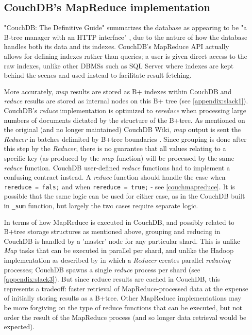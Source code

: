 

\subsection{CouchDB's MapReduce implementation}
"CouchDB: The Definitive Guide" summarizes the database as appearing to be "a B-tree manager with an HTTP interface" \cite{couchguide}, due to the nature of how the database handles both its data and its indexes. CouchDB's MapReduce API actually allows for defining indexes rather than queries; a user is given direct access to the raw indexes, unlike other DBMSs such as SQL Server where indexes are kept behind the scenes and used instead to facilitate result fetching.

More accurately, \textit{map} results are stored as B+ indexes within CouchDB and \textit{reduce} results are stored as internal nodes on this B+ tree (see \ref{appendix:slack1}). CouchDB's \textit{reduce} implementation is optimized to \textit{rereduce} when processing large numbers of documents dictated by the structure of the B+tree. As mentioned on the original (and no longer maintained) CouchDB Wiki, \textit{map} output is sent the \textit{Reducer} in batches delimited by B+tree boundaries \cite{couchwiki}. Since grouping is done after this step by the \textit{Reducer}, there is no guarantee that all values relating to a specific key (as produced by the \textit{map} function) will be processed by the same \textit{reduce} function. CouchDB user-defined \textit{reduce} functions had to implement a confusing contract instead. A \textit{reduce} function should handle the case when \texttt{rereduce = fals;} and when \texttt{rereduce = true;} - see \ref{couchmapreduce}. It is possible that the same logic can be used for either case, as in the CouchDB built in \texttt{_sum} function, but largely the two cases require separate logic.

In terms of how MapReduce is executed in CouchDB, and possibly related to B+tree storage structures as mentioned above, grouping and reducing in CouchDB is handled by a 'master' node for any particular shard. This is unlike \textit{Map} tasks that can be executed in parallel per shard, and unlike the Hadoop implementation as described by \cite{chandar2010} in which a \textit{Reducer} creates parallel \textit{reducing} processes; CouchDB spawns a single \textit{reduce} process per shard (see \ref{appendix:slack3}). But since reduce results are cached in CouchDB, this represents a tradeoff: faster retrieval of MapReduce-processed data at the expense of initially storing results as a B+tree. Other MapReduce implementations may be more forgiving on the type of reduce functions that can be executed, but not order the result of the MapReduce process (and so longer data retrieval would be expected).

